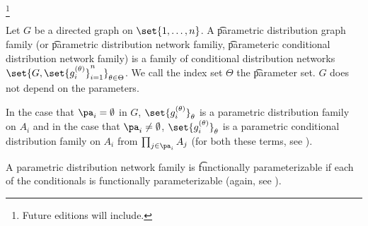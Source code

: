 
\footnote{Future editions will include.}


Let $G$ be a directed graph on $\set{1,\dots, n}$.
A \t{parametric distribution graph family} (or \t{parametric distribution network familiy}, \t{parameteric conditional distribution network family}) is a family of conditional distribution networks $\set{G, \set{g_i^{(\theta)}}_{i=1}^{n}}_{\theta \in \Theta}$.
We call the index set $\Theta$ the \t{parameter set}.
$G$ does not depend on the parameters.

In the case that $\pa_i = \emptyset$ in $G$, $\set{g_i^{(\theta)}}_\theta$ is a parametric distribution family on $A_i$ and in the case that $\pa_i \neq \emptyset$, $\set{g_i^{(\theta)}}_{\theta}$ is a parametric conditional distribution family on $A_i$ from $\prod_{j \in \pa_{i}} A_j$ (for both these terms, see ).

A parametric distribution network family is \t{functionally parameterizable} if each of the conditionals is functionally parameterizable (again, see ).

\blankpage

